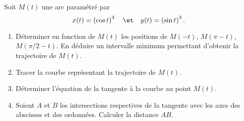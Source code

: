 \begin{enonce}
\begin{exercise}[ID={RMS126 E894},subtitle={ENSAM PSI 2015},tags={}]
Soit $M(t)$ une arc paramétré par
\begin{equation*}
  x(t)=\left( \cos t \right)^3 \quad\et\quad y(t)=\left( \sin t \right)^3.
\end{equation*}
\begin{enumerate}
  \item Déterminer en fonction de $M(t)$ les positions de $M(-t)$, $M(\pi-t)$, $M(\pi/2 - t)$.
    En déduire un intervalle minimum permettant d'obtenir la trajectoire de $M(t)$.

  \item Tracer la courbe représentant la trajectoire de $M(t)$.

  \item Déterminer l'équation de la tangente à la courbe au point $M(t)$.

  \item Soient $A$ et $B$ les intersections respectives de la tangente avec les axes des abscisses et des ordonnées.
    Calculer la distance $AB$.
\end{enumerate}
\end{exercise}
\begin{solution}
\end{solution}
\end{enonce}

